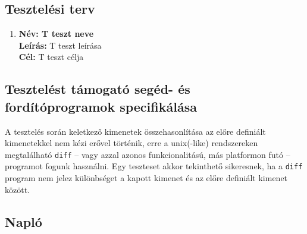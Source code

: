 %		
	    
    	\subsection{Tesztelési terv}
			\newcommand{\testitem}[1]{\item \textbf{Név: #1}\\}
			\newcommand{\tdesc}[1]{\textbf{Leírás: } #1\\}
			\newcommand{\tcel}[1]{\textbf{Cél:} #1\\}
	
			\begin{enumerate}[label=\textbf{\arabic*.}, start=1]
			    \testitem{T teszt neve} %
		        \tdesc{T teszt leírása} %
		        \tcel{T teszt célja} %
			\end{enumerate}
	    	
	\subsection{Tesztelést támogató segéd- és fordítóprogramok specifikálása}		
A tesztelés során keletkező kimenetek összehasonlítása az előre definiált kimenetekkel nem kézi erővel történik, erre a unix(-like) rendszereken megtalálható \texttt{diff} -- vagy azzal azonos funkcionalitású, más platformon futó -- programot fogunk használni. Egy teszteset akkor tekinthető sikeresnek, ha a \texttt{diff} program nem jelez különbséget a kapott kimenet és az előre definiált kimenet között.

	\subsection{Napló}

